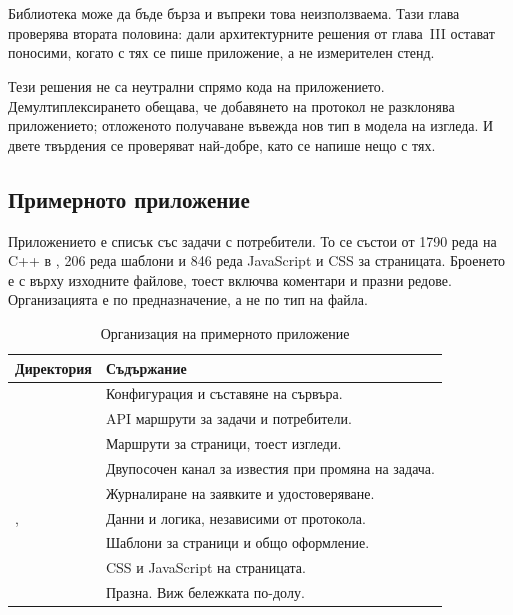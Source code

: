 \section{}

Библиотека може да бъде бърза и въпреки това неизползваема. Тази глава проверява втората
половина: дали архитектурните решения от глава~III остават поносими, когато с тях се пише
приложение, а не измерителен стенд.

Тези решения не са неутрални спрямо кода на приложението. Демултиплексирането обещава, че
добавянето на протокол не разклонява приложението; отложеното получаване въвежда нов тип в
модела на изгледа. И двете твърдения се проверяват най-добре, като се напише нещо с тях.

\subsection{Примерното приложение}

Приложението е списък със задачи с потребители. То се състои от 1790 реда на C++ в
, 206 реда шаблони и 846 реда JavaScript и CSS за страницата.
Броенето е с  върху изходните файлове, тоест включва коментари и празни редове.
Организацията е по предназначение, а не по тип на файла.

\begin{table}[H]
\centering
\caption{Организация на примерното приложение}
\label{tab:example-app}
\begin{tabular}{@{}L{4.9cm}L{9.3cm}@{}}
\toprule
\textbf{Директория} & \textbf{Съдържание} \\
\midrule
{} & Конфигурация и съставяне на сървъра. \\
 & API маршрути за задачи и потребители. \\
 & Маршрути за страници, тоест изгледи. \\
 & Двупосочен канал за известия при промяна на задача. \\
 & Журналиране на заявките и удостоверяване. \\
,  & Данни и логика, независими от протокола. \\
 & Шаблони за страници и общо оформление. \\
 & CSS и JavaScript на страницата. \\
 & Празна. Виж бележката по-долу. \\
\bottomrule
\end{tabular}
\end{table}

